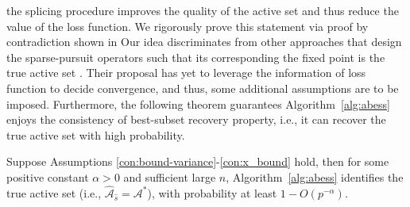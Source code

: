 the splicing procedure improves the quality of the active set and thus
reduce the value of the loss function.
We rigorously prove this statement via proof by contradiction shown in
\fi
Our idea discriminates from other approaches that design
the sparse-pursuit operators such that its corresponding the fixed point is the true active set \citep{li2017quadratic, yuan2018ghtp, huang2020support}. Their proposal has yet to leverage the information of loss function to decide convergence, and thus, some additional assumptions are to be imposed. Furthermore, the following theorem guarantees Algorithm~\ref{alg:abess} enjoys the consistency of best-subset recovery property, i.e.,
it can recover the true active set with high probability.

\begin{theorem}\label{thm:consistency4}
Suppose
Assumptions \ref{con:bound-variance}-\ref{con:x_bound} hold, then for some positive constant $\alpha > 0$ and sufficient large $n$,
Algorithm~\ref{alg:abess} identifies the true active set (i.e., $\hat{\mathcal{A}}_{\hat{s}} = \mathcal{A}^*$), with probability at least $1 - O(p^{-\alpha})$.
\end{theorem}
